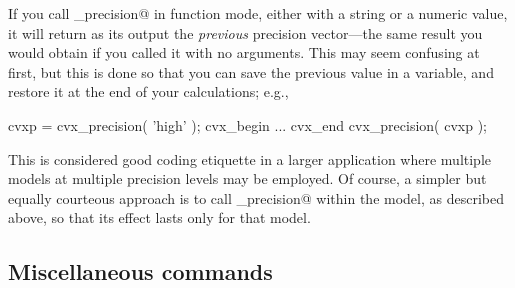\documentclass[12pt]{article}
\begin{document}
If you call \verb@cvx_precision@ in function mode, either with a string or a numeric
value, it will return as its output the \emph{previous} precision vector---the same
result you would obtain if you called it with no arguments. This may
seem confusing at first, but this is done so that you can save the previous value
in a variable, and restore it at the end of your calculations; e.g.,
\begin{code}
	cvxp = cvx_precision( 'high' );
	cvx_begin
		...
	cvx_end
	cvx_precision( cvxp );
\end{code}
This is considered good coding etiquette in a larger application where multiple 
\cvx models at multiple precision levels may be employed. Of course, a simpler but
equally courteous approach is to call \verb@cvx_precision@ within the \cvx
model, as described above, so that its effect lasts only for that model.

\subsection{Miscellaneous \cvx commands}
\label{sec:misc}
\end{document}
